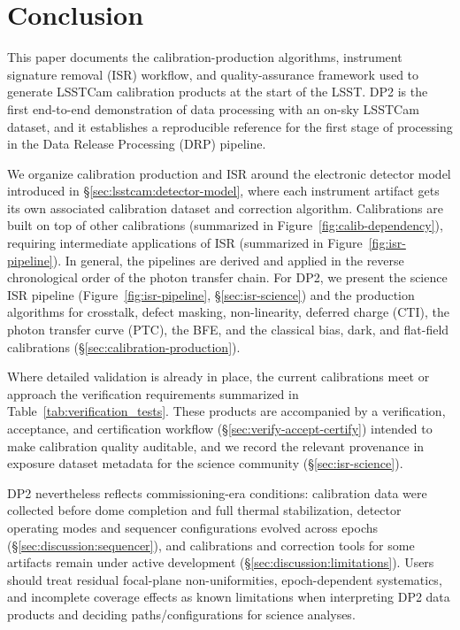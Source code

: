 \section{Conclusion} \label{sec:conclusion}

This paper documents the calibration-production algorithms, instrument signature removal (ISR) workflow, and quality-assurance framework used to generate LSSTCam calibration products at the start of the LSST.
DP2 is the first end-to-end demonstration of data processing with an on-sky LSSTCam dataset, and it establishes a reproducible reference for the first stage of processing in the Data Release Processing (DRP) pipeline.

We organize calibration production and ISR around the electronic detector model introduced in \S\ref{sec:lsstcam:detector-model}, where each instrument artifact gets its own associated calibration dataset and correction algorithm. Calibrations are built on top of other calibrations (summarized in Figure~\ref{fig:calib-dependency}), requiring intermediate applications of ISR (summarized in Figure~\ref{fig:isr-pipeline}).
In general, the pipelines are derived and applied in the reverse chronological order of the photon transfer chain.
For DP2, we present the science ISR pipeline (Figure~\ref{fig:isr-pipeline}, \S\ref{sec:isr-science}) and the production algorithms for crosstalk, defect masking, non-linearity, deferred charge (CTI), the photon transfer curve (PTC), the BFE, and the classical bias, dark, and flat-field calibrations (\S\ref{sec:calibration-production}).

Where detailed validation is already in place, the current calibrations meet or approach the verification requirements summarized in Table~\ref{tab:verification_tests}.
These products are accompanied by a verification, acceptance, and certification workflow (\S\ref{sec:verify-accept-certify}) intended to make calibration quality auditable, and we record the relevant provenance in exposure dataset metadata for the science community (\S\ref{sec:isr-science}).

DP2 nevertheless reflects commissioning-era conditions: calibration data were collected before dome completion and full thermal stabilization, detector operating modes and sequencer configurations evolved across epochs (\S\ref{sec:discussion:sequencer}), and calibrations and correction tools for some artifacts remain under active development (\S\ref{sec:discussion:limitations}).
Users should treat residual focal-plane non-uniformities, epoch-dependent systematics, and incomplete coverage effects as known limitations when interpreting DP2 data products and deciding paths/configurations for science analyses.

